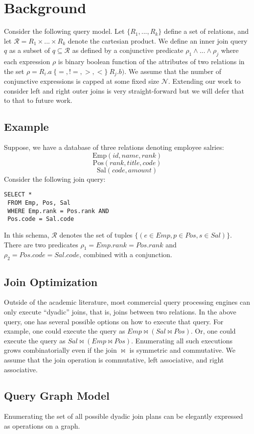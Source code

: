 \section{Background}
Consider the following query model.
Let $\{R_1,...,R_k\}$ define a set of relations, and let $\mathcal{R} = R_1 \times ... \times R_k$ denote the cartesian product.
We define an inner join query $q$ as a subset of $q \subseteq \mathcal{R}$ as defined by a conjunctive predicate $\rho_1 \wedge ... \wedge \rho_j$ where each expression $\rho$ is binary boolean function of the attributes of two relations in the set $\rho = R_i.a ~ \{=,!=,>,<\} ~ R_j.b) $. We assume that the number of conjunctive expressions is capped at some fixed size $\mathcal{N}$.
Extending our work to consider left and right outer joins is very straight-forward but we will defer that to that to future work.

\subsection{Example}
Suppose, we have a database of three relations denoting employee salries:
\[
\text{Emp}(id, name, rank)
\]
\[
\text{Pos}(rank, title, code)
\]
\[
\text{Sal}(code, amount)
\]
Consider the following join query:
\begin{lstlisting}
SELECT *
 FROM Emp, Pos, Sal
 WHERE Emp.rank = Pos.rank AND
 Pos.code = Sal.code
\end{lstlisting}
In this schema, $\mathcal{R}$ denotes the set of tuples $\{(e \in Emp, p \in Pos, s \in Sal)\}$. There are two predicates $\rho_1 = Emp.rank = Pos.rank$ and $\rho_2 = Pos.code = Sal.code$, combined with a conjunction. 

\subsection{Join Optimization}
Outside of the academic literature, most commercial query processing engines can only execute ``dyadic'' joins, that is, joins between two relations. In the above query, one has several possible options on how to execute that query. For example, one could execute the query as $Emp \bowtie (Sal \bowtie Pos)$. Or, one could execute the query as $Sal \bowtie (Emp \bowtie Pos)$. Enumerating all such executions grows combinatorially even if the join $\bowtie$ is symmetric and commutative.
We assume that the join operation is commutative, left associative, and right associative.

\subsection{Query Graph Model}
Enumerating the set of all possible dyadic join plans can be elegantly expressed as operations on a graph.

